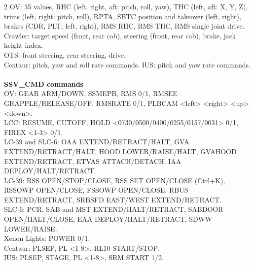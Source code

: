 \documentclass[Space_Shuttle_Vessel_Manual.tex]{subfiles}
\begin{document}
\begin{multicols*}{2}
OV: 35 values, RHC (left, right, aft: pitch, roll, yaw), THC (left, aft: X, Y, Z), trims (left, right: pitch, roll), RPTA, SBTC position and takeover (left, right), brakes (CDR, PLT: left, right), RMS RHC, RMS THC, RMS single joint drive.\\
Crawler: target speed (front, rear cab), steering (front, rear cab), brake, jack height index.\\
OTS: front steering, rear steering, drive.\\
Centaur: pitch, yaw and roll rate commands. IUS: pitch and yaw rate commands.\\
\\
\textbf{SSV\_CMD commands}\\
OV: GEAR ARM/DOWN, SSMEPB, RMS 0/1, RMSEE GRAPPLE/RELEASE/OFF, RMSRATE 0/1, PLBCAM <left> <right> <up> <down>.\\
LCC: RESUME, CUTOFF, HOLD <0730/0500/0400/0255/0157/0031> 0/1, FIREX <1-3> 0/1.\\
LC-39 and SLC-6: OAA EXTEND/RETRACT/HALT, GVA EXTEND/RETRACT/HALT, HOOD LOWER/RAISE/HALT, GVAHOOD EXTEND/RETRACT, ETVAS ATTACH/DETACH, IAA DEPLOY/HALT/RETRACT.\\
LC-39: RSS OPEN/STOP/CLOSE, RSS SET OPEN/CLOSE (Ctrl+K), RSSOWP OPEN/CLOSE, FSSOWP OPEN/CLOSE, RBUS EXTEND/RETRACT, SRBSFD EAST/WEST EXTEND/RETRACT.\\
SLC-6: PCR, SAB and MST EXTEND/HALT/RETRACT, SABDOOR OPEN/HALT/CLOSE, EAA DEPLOY/HALT/RETRACT, SDWW LOWER/RAISE.\\
Xenon Lights: POWER 0/1.\\
Centaur: PLSEP, PL <1-8>, RL10 START/STOP.\\
IUS: PLSEP, STAGE, PL <1-8>, SRM START 1/2.
\end{multicols*}
\newpage
\end{document}
